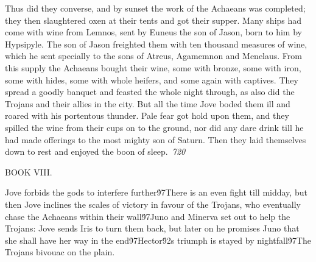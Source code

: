 {Thus did they converse, and by sunset the work of the Achaeans was completed; they then slaughtered oxen at their tents and got their supper. Many ships had come with wine from Lemnos, sent by Euneus the son of Jason, born to him by Hypsipyle. The son of Jason freighted them with ten thousand measures of wine, which he sent specially to the sons of Atreus, Agamemnon and Menelaus. From this supply the Achaeans bought their wine, some with bronze, some with iron, some with hides, some with whole heifers, and some again with captives. They spread a goodly banquet and feasted the whole night through, as also did the Trojans and their allies in the city. But all the time Jove boded them ill and roared with his portentous thunder. Pale fear got hold upon them, and they spilled the wine from their cups on to the ground, nor did any dare drink till he had made offerings to the most mighty son of Saturn. Then they laid themselves down to rest and enjoyed the boon of sleep.\
\pard{}\sl720\qc{}

  BOOK VIII.\
\pard{}\qj{}

 \cf2 Jove forbids the gods to interfere further\'97There is an even fight till midday, but then Jove inclines the scales of victory in favour of the Trojans, who eventually chase the Achaeans within their wall\'97Juno and Minerva set out to help the Trojans: Jove sends Iris to turn them back, but later on he promises Juno that she shall have her way in the end\'97Hector\'92s triumph is stayed by nightfall\'97The Trojans bivouac on the plain.\
\pard{}\qj{}

}
